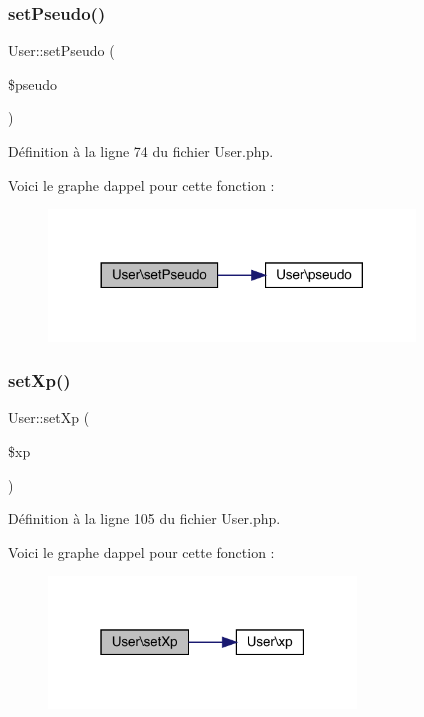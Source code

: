 \subsubsection{\texorpdfstring{set\+Pseudo()}{setPseudo()}}
{\footnotesize\ttfamily User\+::set\+Pseudo (\begin{DoxyParamCaption}\item[{}]{\$pseudo }\end{DoxyParamCaption})}



Définition à la ligne 74 du fichier User.\+php.

Voici le graphe d\textquotesingle{}appel pour cette fonction \+:\nopagebreak
\begin{figure}[H]
\begin{center}
\leavevmode
\includegraphics[width=276pt]{class_user_afa0f13589eb9cdaca9a8192d245fd75f_cgraph}
\end{center}
\end{figure}
\mbox{\label{class_user_a84e2a4262b3229d9bdd3f5a56a2c5606}} 
\subsubsection{\texorpdfstring{set\+Xp()}{setXp()}}
{\footnotesize\ttfamily User\+::set\+Xp (\begin{DoxyParamCaption}\item[{}]{\$xp }\end{DoxyParamCaption})}



Définition à la ligne 105 du fichier User.\+php.

Voici le graphe d\textquotesingle{}appel pour cette fonction \+:\nopagebreak
\begin{figure}[H]
\begin{center}
\leavevmode
\includegraphics[width=232pt]{class_user_a84e2a4262b3229d9bdd3f5a56a2c5606_cgraph}
\end{center}
\end{figure}
\mbox{\label{class_user_af20c5c334c10fbacbf8204963f7c588a}} 
